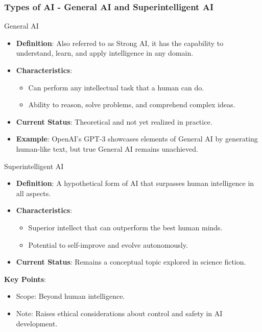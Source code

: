 \documentclass[aspectratio=169]{beamer}
\begin{document}
\begin{frame}[fragile]
    \frametitle{Types of AI - General AI and Superintelligent AI}
    \begin{block}{General AI}
        \begin{itemize}
            \item \textbf{Definition}: Also referred to as Strong AI, it has the capability to understand, learn, and apply intelligence in any domain.
            \item \textbf{Characteristics}:
                \begin{itemize}
                    \item Can perform any intellectual task that a human can do.
                    \item Ability to reason, solve problems, and comprehend complex ideas.
                \end{itemize}
            \item \textbf{Current Status}: Theoretical and not yet realized in practice. 
            \item \textbf{Example}: OpenAI's GPT-3 showcases elements of General AI by generating human-like text, but true General AI remains unachieved.
        \end{itemize}
    \end{block}
    
    \begin{block}{Superintelligent AI}
        \begin{itemize}
            \item \textbf{Definition}: A hypothetical form of AI that surpasses human intelligence in all aspects.
            \item \textbf{Characteristics}:
                \begin{itemize}
                    \item Superior intellect that can outperform the best human minds.
                    \item Potential to self-improve and evolve autonomously.
                \end{itemize}
            \item \textbf{Current Status}: Remains a conceptual topic explored in science fiction.
        \end{itemize}
    \end{block}
    \textbf{Key Points}:
    \begin{itemize}
        \item Scope: Beyond human intelligence.
        \item Note: Raises ethical considerations about control and safety in AI development.
    \end{itemize}
\end{frame}
\end{document}
